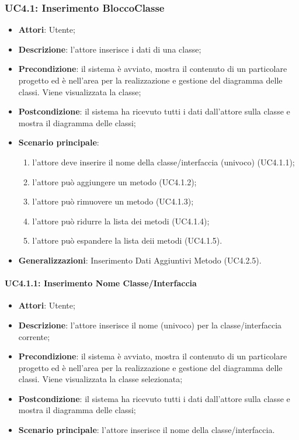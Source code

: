 \subsubsection{UC4.1: Inserimento BloccoClasse}
\label{UC4.1}
\begin{itemize}
	\item \textbf{Attori}: Utente;
	\item \textbf{Descrizione}: l'attore inserisce i dati di una classe;
	\item \textbf{Precondizione}: il sistema è avviato, mostra il contenuto di un particolare progetto ed è nell'area per la realizzazione e gestione del diagramma delle classi. Viene visualizzata la classe;
	\item \textbf{Postcondizione}: il sistema ha ricevuto tutti i dati dall'attore sulla classe e mostra il diagramma delle classi;
	\item \textbf{Scenario principale}:
	\begin{enumerate}
		\item l'attore deve inserire il nome della classe/interfaccia (univoco) (UC4.1.1);
		\item l'attore può aggiungere un metodo (UC4.1.2);
		\item l'attore può rimuovere un metodo (UC4.1.3);
		\item l'attore può ridurre la lista dei metodi (UC4.1.4);
		\item l'attore può espandere la lista deii metodi (UC4.1.5).
	\end{enumerate}
	\item \textbf{Generalizzazioni}: Inserimento Dati Aggiuntivi Metodo (UC4.2.5).%
\end{itemize}

\paragraph{UC4.1.1: Inserimento Nome Classe/Interfaccia}
\label{UC4.1.1}
\begin{itemize}
	\item \textbf{Attori}: Utente;
	\item \textbf{Descrizione}: l'attore inserisce il nome (univoco) per la classe/interfaccia corrente;
	\item \textbf{Precondizione}: il sistema è avviato, mostra il contenuto di un particolare progetto ed è nell'area per la realizzazione e gestione del diagramma delle classi. Viene visualizzata la classe selezionata;
	\item \textbf{Postcondizione}: il sistema ha ricevuto tutti i dati dall'attore sulla classe e mostra il diagramma delle classi;
	\item \textbf{Scenario principale}: l'attore inserisce il nome della classe/interfaccia.
\end{itemize}


